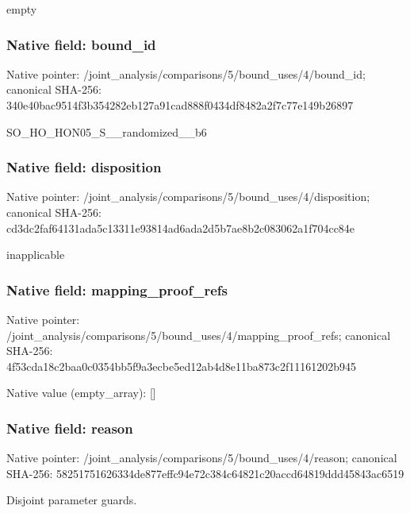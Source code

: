 \documentclass[10pt,a4paper]{article}
\begin{document}
\begingroup\raggedright\sloppy empty\par\endgroup

\subsubsection{Native field: bound\_\allowbreak{}id}
Native pointer: /joint\_\allowbreak{}analysis/comparisons/5/bound\_\allowbreak{}uses/4/bound\_\allowbreak{}id; canonical SHA-256: 340e40bac9514f3b354282eb127a91cad888f0434df8482a2f7c77e149b26897

\begingroup\raggedright\sloppy SO\_\allowbreak{}HO\_\allowbreak{}HON05\_\allowbreak{}S\_\allowbreak{}\_\allowbreak{}randomized\_\allowbreak{}\_\allowbreak{}b6\par\endgroup

\subsubsection{Native field: disposition}
Native pointer: /joint\_\allowbreak{}analysis/comparisons/5/bound\_\allowbreak{}uses/4/disposition; canonical SHA-256: cd3dc2faf64131ada5c13311e93814ad6ada2d5b7ae8b2c083062a1f704cc84e

\begingroup\raggedright\sloppy inapplicable\par\endgroup

\subsubsection{Native field: mapping\_\allowbreak{}proof\_\allowbreak{}refs}
Native pointer: /joint\_\allowbreak{}analysis/comparisons/5/bound\_\allowbreak{}uses/4/mapping\_\allowbreak{}proof\_\allowbreak{}refs; canonical SHA-256: 4f53cda18c2baa0c0354bb5f9a3ecbe5ed12ab4d8e11ba873c2f11161202b945

Native value (empty\_\allowbreak{}array): []

\subsubsection{Native field: reason}
Native pointer: /joint\_\allowbreak{}analysis/comparisons/5/bound\_\allowbreak{}uses/4/reason; canonical SHA-256: 58251751626334de877effc94e72c384c64821c20accd64819ddd45843ac6519

\begingroup\raggedright\sloppy Disjoint parameter guards.\par\endgroup
\end{document}
